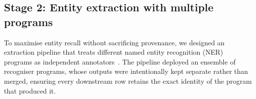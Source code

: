 \documentclass[referee,lineno,pdflatex,sn-vancouver-num]{sn-jnl}
\theoremstyle{thmstyleone}%
\theoremstyle{thmstyletwo}%
\theoremstyle{thmstylethree}%
\begin{document}
\subsection{Stage 2: Entity extraction with multiple programs}\label{sec:stage2}

To maximise entity recall without sacrificing provenance, we designed an
extraction pipeline that treats different named entity recognition (NER)
programs as independent annotators~\cite{patel2026microbialner}. The pipeline
deployed an ensemble of recogniser programs, whose outputs were intentionally
kept separate rather than merged, ensuring every downstream row retains the
exact identity of the program that produced it.
\end{document}
